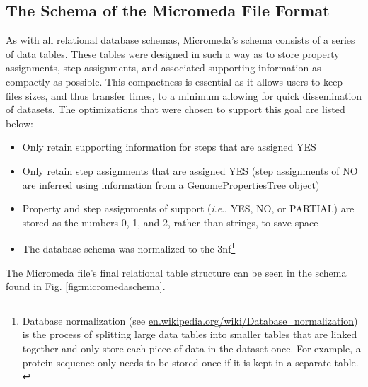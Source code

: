 \FloatBarrier
\subsection{The Schema of the Micromeda File Format}

As with all relational database schemas, Micromeda's schema consists of a series 
of data tables. These tables were designed in such a way as to store property 
assignments, step assignments, and associated supporting information as 
compactly as possible. This compactness is essential as it allows users to keep 
files sizes, and thus transfer times, to a minimum allowing for quick 
dissemination of datasets. The optimizations that were chosen to support this 
goal are listed below:

\FloatBarrier
\begin{itemize}
\item Only retain supporting information for steps that are assigned YES
\item Only retain step assignments that are assigned YES (step assignments of NO 
are inferred using information from a GenomePropertiesTree object)
\item Property and step assignments of support (\textit{i}.\textit{e}., YES, NO, or PARTIAL) are 
stored as the numbers 0, 1, and 2, rather than strings, to save space
\item The database schema was normalized to the \gls{3nf}\footnote{Database 
normalization (see 
\href{http://en.wikipedia.org/wiki/Database_normalization}{en.wikipedia.org/wiki/Database\_normalization}) 
is the process of splitting large data tables into smaller tables that are 
linked together and only store each piece of data in the dataset once. For 
example, a protein sequence only needs to be stored once if it is kept in a 
separate table. \label{normalization-note}} \cite{beeri1989sophisticate} 
\end{itemize}

The Micromeda file's final relational table structure can be seen in the schema 
found in Fig. \ref{fig:micromedaschema}.

